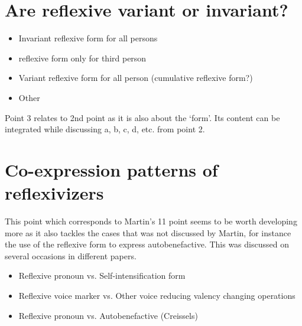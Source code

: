 \documentclass[output=paper]{langsci/langscibook}
\begin{document}
\section{Are reflexive variant or invariant?}
\begin{itemize}
    \item Invariant reflexive form for all persons
\item reflexive form only for third person 
\item Variant reflexive form for all person (cumulative reflexive form?)
\item Other
\end{itemize}

Point 3 relates to 2nd point as it is also about the ‘form’. Its content can be integrated while discussing a, b, c, d, etc. from point 2. 


\section{Co-expression patterns of reflexivizers}
This point which corresponds to Martin’s 11 point seems to be worth developing more as it also tackles the cases that was not discussed by Martin, for instance the use of the reflexive form to express autobenefactive. This was discussed on several occasions in different papers.

\begin{itemize}
    \item Reflexive pronoun vs. Self-intensification form
\item Reflexive voice marker vs. Other voice reducing valency  changing operations
\item Reflexive pronoun vs. Autobenefactive (Creissels)
\end{itemize}
\end{document}
